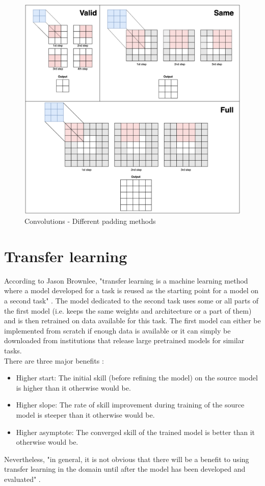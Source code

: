 \begin{figure}[!h]
\centering
\includegraphics[width=1\textwidth, keepaspectratio=true]{./figures/convolution_padding.png}
\caption{Convolutions - Different padding methods}
\label{fig:convolution_padding}
\end{figure}



\section{Transfer learning}
\setlength{\marginparwidth}{3cm}\leavevmode {}According to Jason Brownlee, "transfer learning is a machine learning method where a model developed for a task is reused as the starting point for a model on a second task" \cite{30}. The model dedicated to the second task uses some or all parts of the first model (i.e. keeps the same weights and architecture or a part of them) and is then retrained on data available for this task. The first model can either be implemented from scratch if enough data is available or it can simply be downloaded from institutions that release large pretrained models for similar tasks.\\
There are three major benefits \cite{30}:
\begin{itemize}
\item Higher start: The initial skill (before refining the model) on the source model is higher than it otherwise would be.
\item Higher slope: The rate of skill improvement during training of the source model is steeper than it otherwise would be.
\item Higher asymptote: The converged skill of the trained model is better than it otherwise would be.
\end{itemize}
Nevertheless, "in general, it is not obvious that there will be a benefit to using transfer learning in the domain until after the model has been developed and evaluated" \cite{30}.

